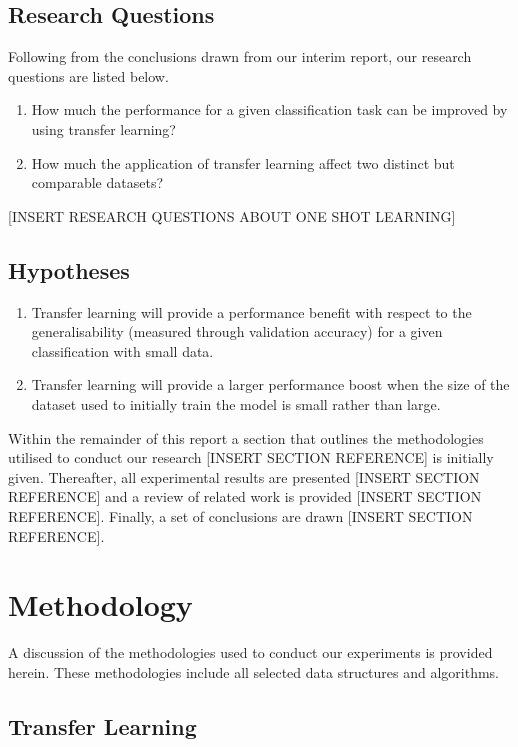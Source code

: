 \documentclass{article}
\begin{document}
\subsection{Research Questions}
\label{sec:questions}
Following from the conclusions drawn from our interim report, our research questions are listed below.

\begin{enumerate}
  \item How much the performance for a given classification task can be improved by using transfer learning?  
  \item How much the application of transfer learning affect two distinct but comparable datasets?
\end{enumerate}

[INSERT RESEARCH QUESTIONS ABOUT ONE SHOT LEARNING]

\subsection{Hypotheses}
\label{sec:hypotheses}
\begin{enumerate}[label=\textbf{H.\arabic*}]
  \item \label{h:1} Transfer learning will provide a performance benefit with respect to the generalisability (measured through validation accuracy) for a given classification with small data.
  \item \label{h:2} Transfer learning will provide a larger performance boost when the size of the dataset used to initially train the model is small rather than large.
 \end{enumerate}

Within the remainder of this report a section that outlines the methodologies utilised to conduct our research [INSERT SECTION REFERENCE] is initially given. Thereafter, all experimental results are presented [INSERT SECTION REFERENCE] and a review of related work is provided [INSERT SECTION REFERENCE]. Finally, a set of conclusions are drawn [INSERT SECTION REFERENCE].

\section{Methodology}
\label{sec:methodology}

A discussion of the methodologies used to conduct our experiments is provided herein. These methodologies include all selected data structures and algorithms.

\subsection{Transfer Learning}
\label{sec:transferlearninng}
\end{document}
